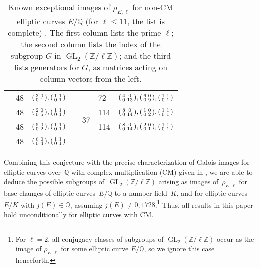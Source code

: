 \documentclass[table,dvipsnames]{amsart}
\newcommand{\Q}{\mathbb{Q}}
\newcommand{\GL}{\operatorname{GL}}
\newcommand{\Z}{\mathbb{Z}}
\newcommand{\smallmat}[4]{\begin{psmallmatrix}#1&#2\\#3&#4\end{psmallmatrix}}
\numberwithin{equation}{section}
\begin{document}
\begin{table}
\begin{tabular}{lllclll}
 & 48 & $\smallmat{3}{0}{0}{1},\smallmat{1}{1}{0}{1}$ & &  & 72 & $\smallmat{4}{0}{0}{13},\smallmat{6}{0}{0}{9},\smallmat{1}{1}{0}{1}$ \\\cmidrule{5-7}
 & 48 & $\smallmat{2}{0}{0}{5},\smallmat{1}{1}{0}{1}$ & & \multirow{2}{*}{37} & 114 & $\smallmat{8}{0}{0}{14},\smallmat{1}{0}{0}{2},\smallmat{1}{1}{0}{1}$ \\
 & 48 & $\smallmat{5}{0}{0}{2},\smallmat{1}{1}{0}{1}$ & &  & 114 & $\smallmat{8}{0}{0}{14},\smallmat{2}{0}{0}{1},\smallmat{1}{1}{0}{1}$ \\
 & 48 & $\smallmat{6}{0}{0}{4},\smallmat{1}{1}{0}{1}$ & & \\
\bottomrule
\end{tabular}
\caption{Known exceptional images of $\rho_{E,\ell}$ for non-CM elliptic curves $E/\Q$ (for $\ell\le 11$, the list is complete) \cite[Tables~3,4]{sutherland2016}. The first column lists the prime $\ell$; the second column lists the index of the subgroup $G$ in $\GL_2(\Z/\ell\Z)$; and the third lists generators for $G$, as matrices acting on column vectors from the left.}
\label{tab:exim}
\end{table}


Combining this conjecture with the precise characterization of Galois images for elliptic curves over~$\Q$ with complex multiplication (CM) given in \cite[Thm.~1.14-1.16]{zywina2015}, we are able to deduce the possible subgroups of~$\GL_2(\Z/\ell\Z)$ arising as images of~$\rho_{E,\ell}$ for base changes of elliptic curves~$E/\Q$ to a number field~$K$, and for elliptic curves~$E/K$ with $j(E)\in\Q$, assuming $j(E)\ne 0,1728$.\footnote{For $\ell=2$, all conjugacy classes of subgroups of $\GL_2(\Z/\ell\Z)$ occur as the image of $\rho_{E,\ell}$ for some elliptic curve $E/\Q$, so we ignore this case henceforth.} Thus, all results in this paper hold unconditionally for elliptic curves with CM.
\end{document}
